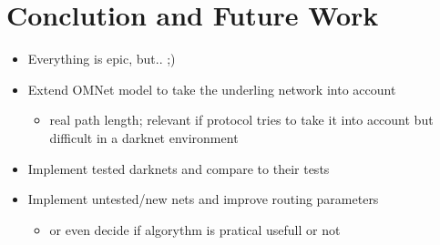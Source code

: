 \chapter{Conclution and Future Work}

\begin{itemize}
\item Everything is epic, but.. ;)
\item Extend OMNet model to take the underling network into account \begin{itemize}
	\item real path length; relevant if protocol tries to take it into account but difficult in a darknet environment
\end{itemize}
\item Implement tested darknets and compare to their tests
\item Implement untested/new nets and improve routing parameters
\begin{itemize} \item        or even decide if algorythm is pratical usefull or not \end{itemize}
\end{itemize}
